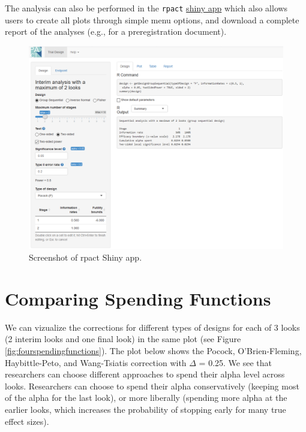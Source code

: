 \documentclass[
  oneside]{krantz}
\begin{document}
The analysis can also be performed in the \texttt{rpact} \href{https://rpact.shinyapps.io/public/}{shiny app} which also allows users to create all plots through simple menu options, and download a complete report of the analyses (e.g., for a preregistration document).



\begin{figure}

{\centering \includegraphics[width=1\linewidth]{images/RPact1} 

}

\caption{Screenshot of rpact Shiny app.}\label{fig:rpactshiny}
\end{figure}

\hypertarget{comparing-spending-functions}{%
\section{Comparing Spending Functions}\label{comparing-spending-functions}}

We can vizualize the corrections for different types of designs for each of 3 looks (2 interim looks and one final look) in the same plot (see Figure \ref{fig:fourspendingfunctions}). The plot below shows the Pocock, O'Brien-Fleming, Haybittle-Peto, and Wang-Tsiatis correction with \(\Delta\) = 0.25. We see that researchers can choose different approaches to spend their alpha level across looks. Researchers can choose to spend their alpha conservatively (keeping most of the alpha for the last look), or more liberally (spending more alpha at the earlier looks, which increases the probability of stopping early for many true effect sizes).
\end{document}
